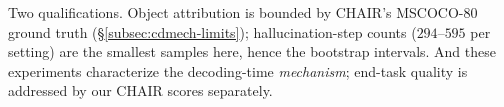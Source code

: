 \documentclass{article}
\begin{document}
Two qualifications. Object attribution is bounded by CHAIR's MSCOCO-80 ground
truth (\S\ref{subsec:cdmech-limits}); hallucination-step counts ($294$--$595$ per
setting) are the smallest samples here, hence the bootstrap intervals. And these
experiments characterize the decoding-time \emph{mechanism}; end-task quality is
addressed by our CHAIR scores separately.




\end{document}
